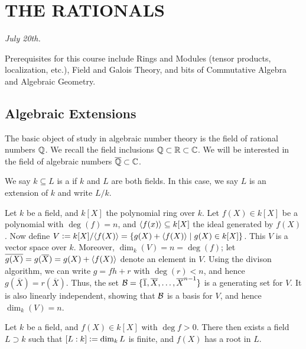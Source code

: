 \chapter{THE RATIONALS}

\textit{July 20th.}

Prerequisites for this course include Rings and Modules (tensor products, localization, etc.), Field and Galois Theory, and bits of Commutative Algebra and Algebraic Geometry.

\section{Algebraic Extensions}
The basic object of study in algebraic number theory is the field of rational numbers $\mathbb{Q}$. We recall the field inclusions $\mathbb{Q} \subset \mathbb{R} \subset \mathbb{C}$. We will be interested in the field of algebraic numbers $\overline{\mathbb{Q}} \subset \mathbb{C}$.

\begin{definition}
    We say $k \subseteq L$ is a  if $k$ and $L$ are both fields. In this case, we say $L$ is an extension of $k$ and write $L/k$. 
\end{definition}

Let $k$ be a field, and $k[X]$ the polynomial ring over $k$. Let $f(X) \in k[X]$ be a polynomial with $\deg(f) = n$, and $\langle f(x)\rangle \subseteq k[X]$ the ideal generated by $f(X)$. Now define $V \vcentcolon= k[X]/\langle f(X)\rangle = \{g(X) + \langle f(X)\rangle \mid g(X) \in k[X]\}$. This $V$ is a vector space over $k$. Moreover, $\dim_{k}(V) = n = \deg(f)$; let $\overline{g(X)} = g(\overline{X}) = g(X) + \langle f(X)\rangle$ denote an element in $V$. Using the divison algorithm, we can write $g = fh + r$ with $\deg(r) < n$, and hence $g(\overline{X}) = r(\overline{X})$. Thus, the set $\mathcal{B} = \{\overline{1}, \overline{X}, \ldots, \overline{X}^{n-1}\}$ is a generating set for $V$. It is also linearly independent, showing that $\mathcal{B}$ is a basis for $V$, and hence $\dim_{k}(V) = n$.

\begin{theorem}
    Let $k$ be a field, and $f(X) \in k[X]$ with $\deg f > 0$. There then exists a field $L \supset k$ such that $[L:k] \vcentcolon= \dim_{k}L$ is finite, and $f(X)$ has a root in $L$.
\end{theorem}

